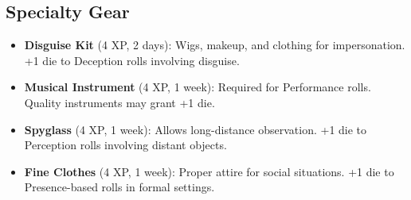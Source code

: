 \documentclass[12pt]{article}
\begin{document}
\subsection*{Specialty Gear}

\begin{itemize}[leftmargin=*]
  \item \textbf{Disguise Kit} (4 XP, 2 days): Wigs, makeup, and clothing for impersonation. +1 die to Deception rolls involving disguise.
  \item \textbf{Musical Instrument} (4 XP, 1 week): Required for Performance rolls. Quality instruments may grant +1 die.
  \item \textbf{Spyglass} (4 XP, 1 week): Allows long-distance observation. +1 die to Perception rolls involving distant objects.
  \item \textbf{Fine Clothes} (4 XP, 1 week): Proper attire for social situations. +1 die to Presence-based rolls in formal settings.
\end{itemize}
\end{document}
